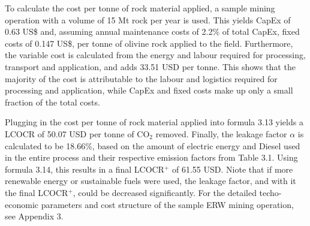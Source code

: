 To calculate the cost per tonne of rock material applied, a sample mining operation with a volume of 15 Mt rock per year is used. This yields CapEx of 0.63 US\$ and, assuming annual maintenance costs of 2.2\% of total CapEx, fixed costs of 0.147 US\$, per tonne of olivine rock applied to the field. Furthermore, the variable cost is calculated from the energy and labour required for processing, transport and application, and adds 33.51 USD per tonne. This shows that the majority of the cost is attributable to the labour and logistics required for processing and application, while CapEx and fixed costs make up only a small fraction of the total costs.\vspace{2mm}

Plugging in the cost per tonne of rock material applied into formula 3.13 yields a LCOCR of 50.07 USD per tonne of CO$_2$ removed. Finally, the leakage factor $\alpha$ is calculated to be 18.66\%, based on the amount of electric energy and Diesel used in the entire process and their respective emission factors from Table 3.1. Using formula 3.14, this results in a final LCOCR$^+$ of 61.55 USD. Niote that if more renewable energy or sustainable fuels were used, the leakage factor, and with it the final LCOCR$^+$, could be decreased significantly. For the detailed techo-economic parameters and cost structure of the sample ERW mining operation, see Appendix 3.